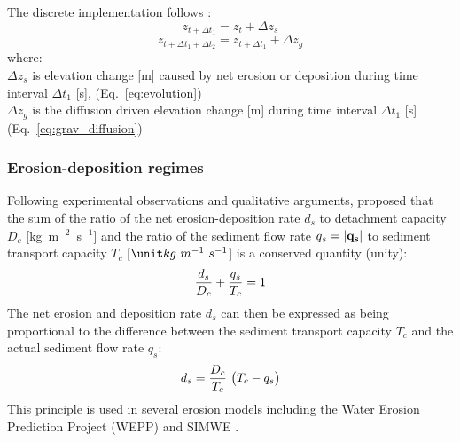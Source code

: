 \documentclass[gmd, manuscript]{copernicus}
\begin{document}
\noindent
The discrete implementation follows \cite{Thaxton2004}:
\begin{equation}
\label{eq:evolution_disc1} 
z_{t+ \Delta t_1} = z_t + \Delta z_s  
\end{equation}
\begin{equation}
\label{eq:evolution_disc2} 
z_{t+\Delta t_1+\Delta t_2} = z_{t+\Delta t_1} + \Delta z_g 
\end{equation}
{\small
where: \\
\noindent
\hspace*{0.5em} $\Delta z_s$ is elevation change [\unit{m}] caused by net erosion or deposition during time interval $\Delta t_1$ [\unit{s}],
(Eq.~\ref{eq:evolution})\\
\hspace*{0.5em} $\Delta z_g$ is the diffusion driven elevation change [\unit{m}] during time interval $\Delta t_1$ [\unit{s}] 
(Eq.~\ref{eq:grav_diffusion})\\
}

\subsubsection{Erosion-deposition regimes}

Following experimental observations and qualitative arguments, 
\cite{Foster1977} proposed that the sum of 
the ratio of the net erosion-deposition rate $d_s$ 
to detachment capacity  $D_c$  [\unit{kg~m}$^{-2}$~\unit{s}$^{-1}$] 
and the ratio of the sediment flow rate $q_s = |{\bf q_s}|$ 
to sediment transport capacity $T_c$ [$\unit kg~m^{-1}~s^{-1}$]
is a conserved quantity (unity):
\begin{equation}
\label{eq:foster_law}
{d_s \over D_c} + {q_s \over T_c} = 1
\end{equation}
The net erosion and deposition rate $d_s$ can then be expressed 
as being proportional to the difference between
the sediment transport capacity $T_c$ 
and the actual sediment flow rate $q_s$:
\begin{equation}
\label{eq:sigma}
d_s = {D_c \over T_c}~\bigl( T_c - q_s\bigr)
\end{equation}
\noindent
This principle is used in several erosion models 
including the Water Erosion Prediction Project (WEPP) \citep{Flanagan2013} 
and SIMWE \citep{Mitas1998}. 
\end{document}

